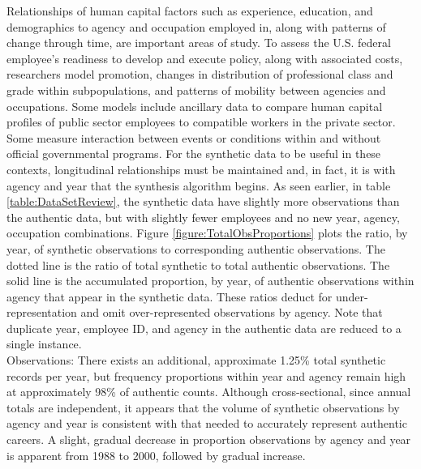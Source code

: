 \documentclass[10pt, letterpaper]{article}
\begin{document}
\begin{spacing}{1.0}
Relationships of human capital factors such as experience, education, and demographics to agency and occupation employed in, along with patterns of change through time, are important areas of study.  To assess the U.S. federal employee's readiness to develop and execute policy, along with associated costs, researchers model promotion, changes in distribution of professional class and grade within subpopulations, and patterns of mobility between agencies and occupations.  Some models include ancillary data to compare human capital profiles of public sector employees to compatible workers in the private sector.  Some measure interaction between events or conditions within and without official governmental programs.  For the synthetic data to be useful in these contexts, longitudinal relationships must be maintained and, in fact, it is with agency and year that the synthesis algorithm begins.  As seen earlier, in table \ref{table:DataSetReview}, the synthetic data have slightly more observations than the authentic data, but with slightly fewer employees and no new year, agency, occupation combinations.  Figure \ref{figure:TotalObsProportions} plots the ratio, by year, of synthetic observations to corresponding authentic observations.  The dotted line is the ratio of total synthetic to total authentic observations.  The solid line is the accumulated proportion, by year, of authentic observations within agency that appear in the synthetic data.  These ratios deduct for under-representation and omit over-represented observations by agency.  Note that duplicate year, employee ID, and agency in the authentic data are reduced to a single instance.\\

Observations:  There exists an additional, approximate 1.25\% total synthetic records per year, but frequency proportions within year and agency remain high at approximately 98\% of authentic counts.  Although cross-sectional, since annual totals are independent, it appears that the volume of synthetic observations by agency and year is consistent with that needed to accurately represent authentic careers.  A slight, gradual decrease in proportion observations by agency and year is apparent from 1988 to 2000, followed by gradual increase. 

\vspace{2pt}


\end{spacing}
\end{document}
